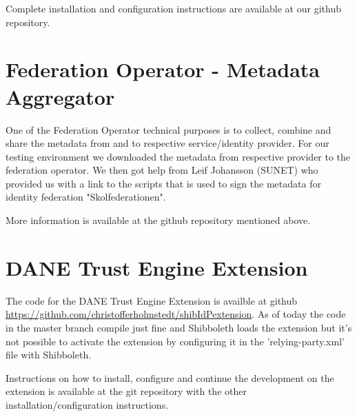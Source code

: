 Complete installation and configuration instructions are available at our github repository.

\section{Federation Operator - Metadata Aggregator}
One of the Federation Operator technical purposes is to collect, combine and share the metadata from and to respective service/identity provider.
For our testing environment we downloaded the metadata from respective provider to the federation operator.
We then got help from Leif Johansson (SUNET) who provided us with a link to the scripts that is used to sign the metadata for identity federation "Skolfederationen".

More information is available at the github repository mentioned above.

\section{DANE Trust Engine Extension}
The code for the DANE Trust Engine Extension is availble at github \url{https://github.com/christofferholmstedt/shibIdPextension}.
As of today the code in the master branch compile just fine and Shibboleth loads the extension but it's not possible to activate the extension by configuring it in the 'relying-party.xml' file with Shibboleth.

Instructions on how to install, configure and continue the development on the extension is available at the git repository with the other installation/configuration instructions.

